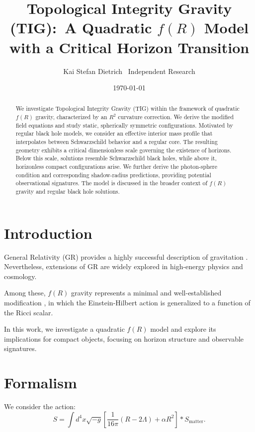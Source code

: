 \documentclass[11pt,a4paper]{article}
\title{Topological Integrity Gravity (TIG):\
A Quadratic $f(R)$ Model with a Critical Horizon Transition}
\author{
Kai Stefan Dietrich \
Independent Research
}
\date{\today}
\begin{document}
\maketitle

\begin{abstract}
We investigate Topological Integrity Gravity (TIG) within the framework of quadratic $f(R)$ gravity, characterized by an $R^2$ curvature correction. We derive the modified field equations and study static, spherically symmetric configurations. Motivated by regular black hole models, we consider an effective interior mass profile that interpolates between Schwarzschild behavior and a regular core. The resulting geometry exhibits a critical dimensionless scale governing the existence of horizons. Below this scale, solutions resemble Schwarzschild black holes, while above it, horizonless compact configurations arise. We further derive the photon-sphere condition and corresponding shadow-radius predictions, providing potential observational signatures. The model is discussed in the broader context of $f(R)$ gravity and regular black hole solutions.
\end{abstract}

\section{Introduction}

General Relativity (GR) provides a highly successful description of gravitation \cite{einstein1915, wald1984}. Nevertheless, extensions of GR are widely explored in high-energy physics and cosmology.

Among these, $f(R)$ gravity represents a minimal and well-established modification \cite{defelice2010, sotiriou2010}, in which the Einstein-Hilbert action is generalized to a function of the Ricci scalar.

In this work, we investigate a quadratic $f(R)$ model and explore its implications for compact objects, focusing on horizon structure and observable signatures.

\section{Formalism}

We consider the action:
\begin{equation}
S = \int d^4x \sqrt{-g}
\left[
\frac{1}{16\pi}(R - 2\Lambda) + \alpha R^2
\right]

* S_{\mathrm{matter}}.
  \end{equation}
\end{document}
